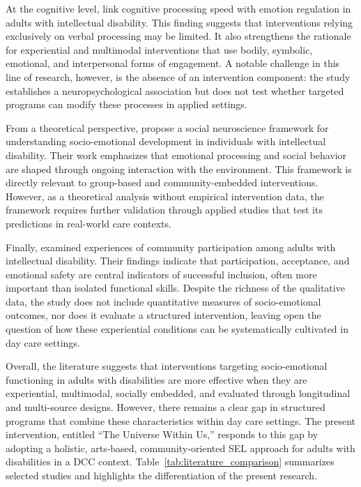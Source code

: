 \documentclass[12pt,a4paper]{article}
\begin{document}
At the cognitive level, \textcite{okafor2025} link cognitive processing speed with emotion regulation in adults with intellectual disability. This finding suggests that interventions relying exclusively on verbal processing may be limited. It also strengthens the rationale for experiential and multimodal interventions that use bodily, symbolic, emotional, and interpersonal forms of engagement. A notable challenge in this line of research, however, is the absence of an intervention component: the study establishes a neuropsychological association but does not test whether targeted programs can modify these processes in applied settings.

From a theoretical perspective, \textcite{sappok2022} propose a social neuroscience framework for understanding socio-emotional development in individuals with intellectual disability. Their work emphasizes that emotional processing and social behavior are shaped through ongoing interaction with the environment. This framework is directly relevant to group-based and community-embedded interventions. However, as a theoretical analysis without empirical intervention data, the framework requires further validation through applied studies that test its predictions in real-world care contexts.

Finally, \textcite{parsakia2024} examined experiences of community participation among adults with intellectual disability. Their findings indicate that participation, acceptance, and emotional safety are central indicators of successful inclusion, often more important than isolated functional skills. Despite the richness of the qualitative data, the study does not include quantitative measures of socio-emotional outcomes, nor does it evaluate a structured intervention, leaving open the question of how these experiential conditions can be systematically cultivated in day care settings.

Overall, the literature suggests that interventions targeting socio-emotional functioning in adults with disabilities are more effective when they are experiential, multimodal, socially embedded, and evaluated through longitudinal and multi-source designs. However, there remains a clear gap in structured programs that combine these characteristics within day care settings. The present intervention, entitled ``The Universe Within Us,'' responds to this gap by adopting a holistic, arts-based, community-oriented SEL approach for adults with disabilities in a DCC context.
Table~\ref{tab:literature_comparison} summarizes selected studies and highlights the differentiation of the present research.
\end{document}
